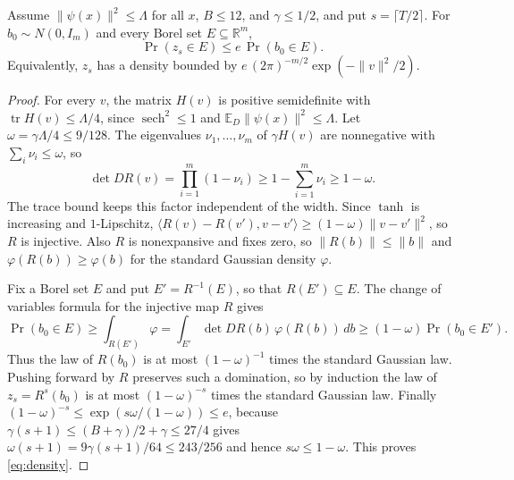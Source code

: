 \documentclass[11pt,letterpaper,pmlr,twoside]{jmlr}
\newcommand{\R}{\mathbb R}\newcommand{\E}{\mathbb E}
\newcommand{\ip}[2]{\langle #1,#2\rangle}\newcommand{\norm}[1]{\lVert #1\rVert}
\begin{document}
\begin{lemma}
\label{lem:density}
Assume $\norm{\psi(x)}^2\le\Lambda$ for all $x$, $B\le12$, and $\gamma\le1/2$, and put $s=\lceil T/2\rceil$. For $b_0\sim N(0,I_m)$ and every Borel set $E\subseteq\R^m$,
\begin{equation}
 \Pr(z_s\in E)\le e\,\Pr(b_0\in E).
 \label{eq:density}
\end{equation}
Equivalently, $z_s$ has a density bounded by $e\,(2\pi)^{-m/2}\exp(-\norm v^2/2)$.
\end{lemma}
\begin{proof}
For every $v$, the matrix $H(v)$ is positive semidefinite with $\operatorname{tr}H(v)\le\Lambda/4$, since $\operatorname{sech}^2\le1$ and $\E_D\norm{\psi(x)}^2\le\Lambda$. Let $\omega=\gamma\Lambda/4\le9/128$. The eigenvalues $\nu_1,\ldots,\nu_m$ of $\gamma H(v)$ are nonnegative with $\sum_i\nu_i\le\omega$, so
\[
 \det DR(v)=\prod_{i=1}^m(1-\nu_i)\ge1-\sum_{i=1}^m\nu_i\ge1-\omega.
\]
The trace bound keeps this factor independent of the width. Since $\tanh$ is increasing and $1$-Lipschitz, $\ip{R(v)-R(v')}{v-v'}\ge(1-\omega)\norm{v-v'}^2$, so $R$ is injective. Also $R$ is nonexpansive and fixes zero, so $\norm{R(b)}\le\norm b$ and $\varphi(R(b))\ge\varphi(b)$ for the standard Gaussian density $\varphi$.

Fix a Borel set $E$ and put $E'=R^{-1}(E)$, so that $R(E')\subseteq E$. The change of variables formula for the injective map $R$ gives
\[
 \Pr(b_0\in E)\ge\int_{R(E')}\varphi
 =\int_{E'}\det DR(b)\,\varphi(R(b))\,db
 \ge(1-\omega)\Pr(b_0\in E').
\]
Thus the law of $R(b_0)$ is at most $(1-\omega)^{-1}$ times the standard Gaussian law. Pushing forward by $R$ preserves such a domination, so by induction the law of $z_s=R^s(b_0)$ is at most $(1-\omega)^{-s}$ times the standard Gaussian law. Finally $(1-\omega)^{-s}\le\exp(s\omega/(1-\omega))\le e$, because $\gamma(s+1)\le(B+\gamma)/2+\gamma\le27/4$ gives $\omega(s+1)=9\gamma(s+1)/64\le243/256$ and hence $s\omega\le1-\omega$. This proves \eqref{eq:density}.
\end{proof}
\end{document}
